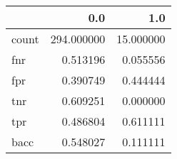 \begin{tabular}{lrr}
\toprule
{} &         0.0 &        1.0 \\
\midrule
count &  294.000000 &  15.000000 \\
fnr   &    0.513196 &   0.055556 \\
fpr   &    0.390749 &   0.444444 \\
tnr   &    0.609251 &   0.000000 \\
tpr   &    0.486804 &   0.611111 \\
bacc  &    0.548027 &   0.111111 \\
\bottomrule
\end{tabular}
